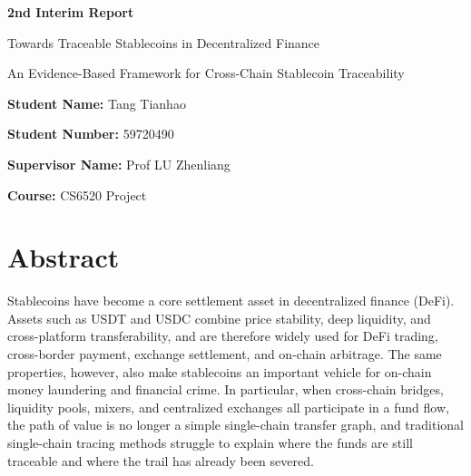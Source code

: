 \documentclass[12pt,a4paper]{article}
\begin{document}
\begin{titlepage}
    \centering
    \vspace*{2cm}
    {\Huge\bfseries 2nd Interim Report\par}
    \vspace{2cm}

    {\huge Towards Traceable Stablecoins in Decentralized Finance\par}
    \vspace{0.6cm}
    {\large An Evidence-Based Framework for Cross-Chain Stablecoin Traceability\par}

    \vfill

    {\large \textbf{Student Name:} Tang Tianhao\par}
    \vspace{0.5cm}
    {\large \textbf{Student Number:} 59720490\par}
    \vspace{1.5cm}
    {\large \textbf{Supervisor Name:} Prof LU Zhenliang\par}
    \vspace{0.5cm}
    {\large \textbf{Course:} CS6520 Project\par}
    \vspace{1.5cm}
\end{titlepage}

\newpage
\tableofcontents
\thispagestyle{empty}
\newpage
\clearpage
\setcounter{page}{1}

\section*{Abstract}

Stablecoins have become a core settlement asset in decentralized finance (DeFi). Assets such as USDT and USDC combine price stability, deep liquidity, and cross-platform transferability, and are therefore widely used for DeFi trading, cross-border payment, exchange settlement, and on-chain arbitrage. The same properties, however, also make stablecoins an important vehicle for on-chain money laundering and financial crime. In particular, when cross-chain bridges, liquidity pools, mixers, and centralized exchanges all participate in a fund flow, the path of value is no longer a simple single-chain transfer graph, and traditional single-chain tracing methods struggle to explain where the funds are still traceable and where the trail has already been severed.
\end{document}
